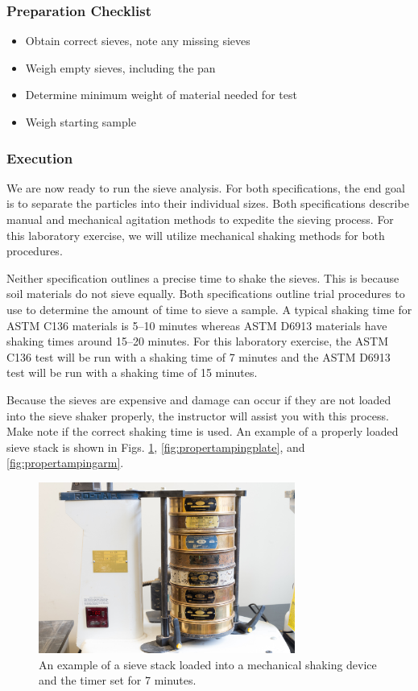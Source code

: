 \documentclass[12pt]{article}
\begin{document}
\subsubsection*{Preparation Checklist}
\begin{itemize}
    \item Obtain correct sieves, note any missing sieves
    \item Weigh empty sieves, including the pan
    \item Determine minimum weight of material needed for test
    \item Weigh starting sample
\end{itemize}

\subsubsection{Execution}
We are now ready to run the sieve analysis. For both specifications, the end goal is to separate the particles into their individual sizes. Both specifications describe manual and mechanical agitation methods to expedite the sieving process. For this laboratory exercise, we will utilize mechanical shaking methods for both procedures.

Neither specification outlines a precise time to shake the sieves. This is because soil materials do not sieve equally. Both specifications outline trial procedures to use to determine the amount of time to sieve a sample. A typical shaking time for ASTM C136 materials is 5--10 minutes whereas ASTM D6913 materials have shaking times around 15--20 minutes. For this laboratory exercise, the ASTM C136 test will be run with a shaking time of 7 minutes and the ASTM D6913 test will be run with a shaking time of 15 minutes.

Because the sieves are expensive and damage can occur if they are not loaded into the sieve shaker properly, the instructor will assist you with this process. Make note if the correct shaking time is used. An example of a properly loaded sieve stack is shown in Figs. \ref{fig:propersieveload}, \ref{fig:propertampingplate}, and \ref{fig:propertampingarm}.

\begin{figure}[H]
    \centering
    \includegraphics[width=0.75\textwidth]{GEO_5721.jpg}
    \caption{An example of a sieve stack loaded into a mechanical shaking device and the timer set for 7 minutes.}
    \label{fig:propersieveload}
\end{figure}
\end{document}
